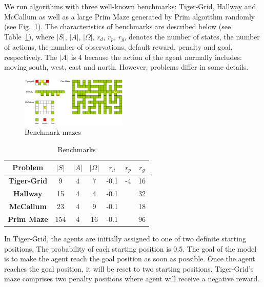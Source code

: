 \documentclass[conference]{IEEEtran}
\begin{document}
	We run algorithms with three well-known benchmarks: Tiger-Grid, Hallway and McCallum 
	as well as a large Prim Maze generated by Prim algorithm randomly
	(see Fig.~\ref{fig:mazes}). The characteristics of benchmarks are described
	below (see Table~\ref{table:benchmarks}), where $|S|$, $|A|$, $|\Omega|$, $r_d$, $r_p$, $r_g$, 
	denotes the number of states, the number of actions, the number of observations, default
	reward, penalty and goal, respectively. The $|A|$ is 4 because the action of the agent
	normally includes: moving south, west, east and north. However, problems differ in some
	details.
	
	\begin{figure}[b]
		\centering
		\includegraphics[width=0.45\textwidth]{mazes.png}
		\caption{Benchmark mazes}
		\label{fig:mazes}
	\end{figure}


\begin{table}[b]
	\caption{Benchmarks}
	\begin{center}
		\begin{tabular}{|c|c|c|c|c|c|c|}
			\hline
			\textbf{Problem}&\textbf{$|S|$}&\textbf{$|A|$}&\textbf{$|\Omega|$}&\textbf{$r_d$}&\textbf{$r_p$}&\textbf{$r_g$}	\\
			\hline
			\textbf{Tiger-Grid}&9      & 4              & 7           & -0.1  & -4    & 16  \\
			\textbf{Hallway}         & 15             & 4              & 4           & -0.1  &     & 32  \\
			\textbf{McCallum}       & 23             & 4              & 9           & -0.1  &     & 18  \\
			\textbf{Prim Maze}       & 154            & 4              & 16          & -0.1  &    & 96  \\
			\hline
		\end{tabular}
		\label{table:benchmarks}
	\end{center}
\end{table}

	In Tiger-Grid, the agents are initially assigned to one of two definite starting positions.
	The probability of each starting position is 0.5. The goal of the model is to make the agent
	reach the goal position as soon as possible. Once the agent reaches the goal position,
	it will be reset to two starting positions. Tiger-Grid's maze comprises two penalty positions
	where agent will receive a negative reward. 
	
\end{document}
